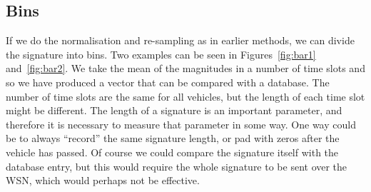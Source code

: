 \subsection{Bins} %
If we do the normalisation and re-sampling as in earlier methods, we can divide the signature into bins. Two examples can be seen in Figures~\ref{fig:bar1} and~\ref{fig:bar2}. We take the mean of the magnitudes in a number of time slots and so we have produced a vector that can be compared with a database. The number of time slots are the same for all vehicles, but the length of each time slot might be different. The length of a signature is an important parameter, and therefore it is necessary to measure that parameter in some way. One way could be to always ``record'' the same signature length, or pad with zeros after the vehicle has passed. Of course we could compare the signature itself with the database entry, but this would require the whole signature to be sent over the WSN, which would perhaps not be effective. 

